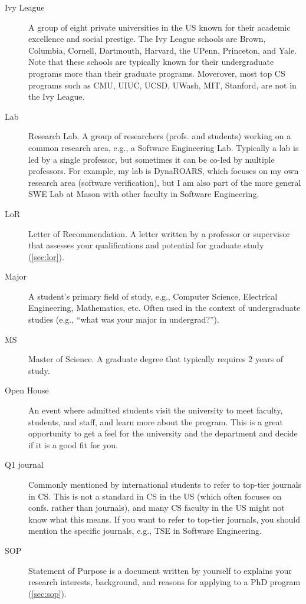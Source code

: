 \documentclass[oneside,11pt,dvipsnames]{book}
\begin{document}
\begin{description}
  \item [Ivy League] A group of eight private universities in the US known for their academic excellence and social prestige. The Ivy League schools are Brown, Columbia, Cornell, Dartmouth, Harvard, the UPenn, Princeton, and Yale. Note that these schools are typically known for their undergraduate programs more than their graduate programs. Moverover, most top CS programs such as CMU, UIUC, UCSD, UWash, MIT, Stanford, are not in the Ivy League.

  \item [Lab] Research Lab. A group of researchers (profs. and students) working on a common research area, e.g., a Software Engineering Lab.  Typically a lab is led by a single professor, but sometimes it can be co-led by multiple professors. For example, my lab is DynaROARS, which focuses on my own research area (software verification), but I am also part of the more general SWE Lab at Mason with other faculty in Software Engineering.



  \item[LoR] Letter of Recommendation. A letter written by a professor or supervisor that assesses your qualifications and potential for graduate study (\autoref{sec:lor}).

  \item[Major] A student's primary field of study, e.g., Computer Science, Electrical Engineering, Mathematics, etc. Often used in the context of undergraduate studies (e.g., ``what was your major in undergrad?'').

  \item[MS] Master of Science. A graduate degree that typically requires 2 years of study.
  \item[Open House] An event where admitted students visit the university to meet faculty, students, and staff, and learn more about the program. This is a great opportunity to get a feel for the university and the department and decide if it is a good fit for you.
  
  \item[Q1 journal] Commonly mentioned by international students to refer to top-tier journals in CS.  This is not a standard in CS in the US (which often focuses on confs. rather than journals), and many CS faculty in the US might not know what this means.  If you want to refer to top-tier journals, you should mention the specific journals, e.g., TSE in Software Engineering.
  
  \item[SOP] Statement of Purpose is a document written by yourself to explains your research interests, background, and reasons for applying to a PhD program (\autoref{sec:sop}).


\end{description}
\end{document}

